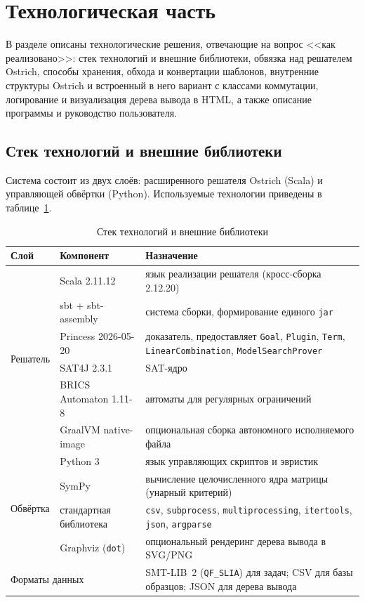 \documentclass[14pt, russian]{scrartcl}
\begin{document}
\section{Технологическая часть}

В разделе описаны технологические решения, отвечающие на вопрос <<как реализовано>>:
стек технологий и внешние библиотеки, обвязка над решателем Ostrich, способы хранения,
обхода и конвертации шаблонов, внутренние структуры Ostrich и встроенный в него вариант
с классами коммутации, логирование и визуализация дерева вывода в HTML, а также описание
программы и руководство пользователя.

\subsection{Стек технологий и внешние библиотеки}
\label{sec:stack}

Система состоит из двух слоёв: расширенного решателя Ostrich (Scala) и управляющей
обвёртки (Python). Используемые технологии приведены в таблице~\ref{tab:stack}.

\begin{table}[h!]
\caption{Стек технологий и внешние библиотеки}
\label{tab:stack}
\begin{tabularx}{\textwidth}{|l|l|X|}
\hline
Слой & Компонент & Назначение \\
\hline
\multirow{6}{*}{Решатель}
 & Scala 2.11.12 & язык реализации решателя (кросс-сборка 2.12.20) \\
\cline{2-3}
 & sbt + sbt-assembly & система сборки, формирование единого \texttt{jar} \\
\cline{2-3}
 & Princess 2026-05-20 & доказатель, предоставляет \texttt{Goal}, \texttt{Plugin},
   \texttt{Term}, \texttt{LinearCombination}, \texttt{ModelSearchProver} \\
\cline{2-3}
 & SAT4J 2.3.1 & SAT-ядро \\
\cline{2-3}
 & BRICS Automaton 1.11-8 & автоматы для регулярных ограничений \\
\cline{2-3}
 & GraalVM native-image & опциональная сборка автономного исполняемого файла \\
\hline
\multirow{4}{*}{Обвёртка}
 & Python 3 & язык управляющих скриптов и эвристик \\
\cline{2-3}
 & SymPy & вычисление целочисленного ядра матрицы (унарный критерий) \\
\cline{2-3}
 & стандартная библиотека & \texttt{csv}, \texttt{subprocess}, \texttt{multiprocessing},
   \texttt{itertools}, \texttt{json}, \texttt{argparse} \\
\cline{2-3}
 & Graphviz (\texttt{dot}) & опциональный рендеринг дерева вывода в SVG/PNG \\
\hline
\multicolumn{2}{|l|}{Форматы данных} & SMT-LIB~2 (\texttt{QF\_SLIA}) для задач;
   CSV для базы образцов; JSON для дерева вывода \\
\hline
\end{tabularx}
\end{table}
\end{document}
